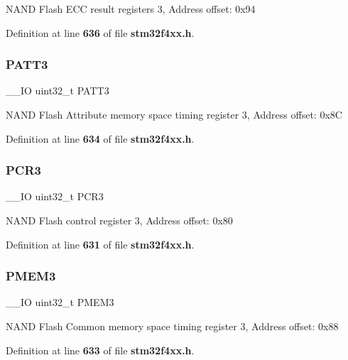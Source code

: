 N\+A\+ND Flash E\+CC result registers 3, Address offset\+: 0x94 

Definition at line \textbf{ 636} of file \textbf{ stm32f4xx.\+h}.

\mbox{\label{structFSMC__Bank3__TypeDef_aba03fea9c1bb2242d963e29f1b94d25e}} 
\subsubsection{P\+A\+T\+T3}
{\footnotesize\ttfamily \+\_\+\+\_\+\+IO uint32\+\_\+t P\+A\+T\+T3}

N\+A\+ND Flash Attribute memory space timing register 3, Address offset\+: 0x8C 

Definition at line \textbf{ 634} of file \textbf{ stm32f4xx.\+h}.

\mbox{\label{structFSMC__Bank3__TypeDef_a73861fa74b83973fa1b5f92735c042ef}} 
\subsubsection{P\+C\+R3}
{\footnotesize\ttfamily \+\_\+\+\_\+\+IO uint32\+\_\+t P\+C\+R3}

N\+A\+ND Flash control register 3, Address offset\+: 0x80 

Definition at line \textbf{ 631} of file \textbf{ stm32f4xx.\+h}.

\mbox{\label{structFSMC__Bank3__TypeDef_aba8981e4f06cfb3db7d9959242052f80}} 
\subsubsection{P\+M\+E\+M3}
{\footnotesize\ttfamily \+\_\+\+\_\+\+IO uint32\+\_\+t P\+M\+E\+M3}

N\+A\+ND Flash Common memory space timing register 3, Address offset\+: 0x88 

Definition at line \textbf{ 633} of file \textbf{ stm32f4xx.\+h}.


